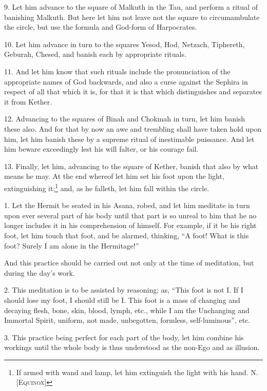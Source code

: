 9. Let him advance to the square of Malkuth in the Tau, and perform a ritual of banishing Malkuth. But here let him not leave not the square to circumambulate the circle, but use the formula and God-form of Harpocrates.

10. Let him advance in turn to the squares Yesod, Hod, Netzach, Tiphereth, Geburah, Chesed, and banish each by appropriate rituals.

11. And let him know that such rituals include the pronunciation of the appropriate names of God backwards, and also a curse against the Sephira in respect of all that which it is, for that it is that which distinguishes and separates it from Kether.

12. Advancing to the squares of Binah and Chokmah in turn, let him banish these also. And for that by now an awe and trembling shall have taken hold upon him, let him banish these by a supreme ritual of inestimable puissance. And let him beware exceedingly lest his will falter, or his courage fail.

13. Finally, let him, advancing to the square of Kether, banish that also by what means he may. At the end whereof let him set his foot upon the light, extinguishing it;\footnote{If armed with wand and lamp, let him extinguish the light with his hand. \textemdash{} N. \textsc{[Equinox]}} and, as he falleth, let him fall within the circle.


1. Let the Hermit be seated in his Asana, robed, and let him meditate in turn upon ever several part of his body until that part is so unreal to him that he no longer includes it in his comprehension of himself. For example, if it be his right foot, let him touch that foot, and be alarmed, thinking, \enquote{A foot! What is this foot? Surely I am alone in the Hermitage!}

And this practice should be carried out not only at the time of meditation, but during the day's work.

2. This meditation is to be assisted by reasoning; as, \enquote{This foot is not I. If I should lose my foot, I should still be I. This foot is a mass of changing and decaying flesh, bone, skin, blood, lymph, etc., while I am the Unchanging and Immortal Spirit, uniform, not made, unbegotten, formless, self-luminous}, etc.

3. This practice being perfect for each part of the body, let him combine his workings until the whole body is thus understood as the non-Ego and as illusion.


